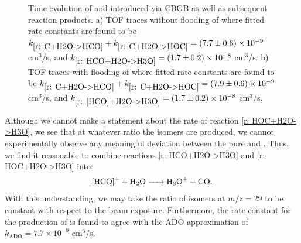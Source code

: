 \begin{figure}[H]
	\centering
	\caption{Time evolution of  and  introduced via CBGB as well as subsequent reaction products. a) TOF traces without flooding of  where fitted rate constants are found to be $k_{\ref{r: C+H2O->HCO}}+k_{\ref{r: C+H2O->HOC}} = (7.7 \pm 0.6) \times 10^{-9}$ cm$^3$/s, and $k_{\ref{r: HCO+H2O->H3O}} = (1.7 \pm 0.2) \times 10^{-8}$ cm$^3$/s. b) TOF traces with flooding of  where fitted rate constants are found to be $k_{\ref{r: C+H2O->HCO}}+k_{\ref{r: C+H2O->HOC}} = (7.9 \pm 0.6) \times 10^{-9}$ cm$^3$/s, and $k_{\ref{r: [HCO]+H2O->H3O}} = (1.7 \pm 0.2) \times 10^{-8}$ cm$^3$/s.}
	\label{fig: [HCO]+H2O rate}
\end{figure}

Although we cannot make a statement about the rate of reaction \ref{r: HOC+H2O->H3O}, we see that at whatever ratio the isomers are produced, we cannot experimentally observe any meaningful deviation between the pure  and . Thus, we find it reasonable to combine reactions \ref{r: HCO+H2O->H3O} and \ref{r: HOC+H2O->H3O} into:
\begin{equation}
	\ce{[HCO]+ + H2O -> H3O+ + CO}. \label{r: [HCO]+H2O->H3O}
\end{equation}
With this understanding, we may take the ratio of isomers at $m/z=29$ to be constant with respect to the  beam exposure. Furthermore, the rate constant for the production of \ce{[HCO]+} is found to agree with the ADO approximation of $k_{\mathrm{ADO}} = 7.7 \times 10^{-9}$ cm$^3$/s.

